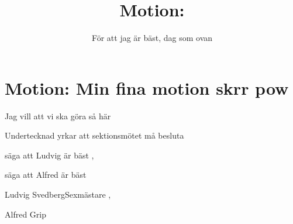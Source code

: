\documentclass[nopdfbookmarks,a4paper, 11pt, twoside]{article}
\title{Motion: \TITLE}
\newcommand{\TITLE}{Min fina motion skrr pow} %
\newcommand{\TEXT}{Jag vill att vi ska göra så här} %
\newcommand{\UNDER}{Undertecknad yrkar att sektionsmötet må besluta}
\newcommand{\ATT}[1]{\item #1}
\begin{document}
\section*{Motion: \TITLE}


\TEXT

\UNDER


\begin{attlista}
	\ATT{säga att Ludvig är bäst}
,\ATT{säga att Alfred är bäst}

\end{attlista}


  \signature{För att jag är bäst, dag som ovan}{Ludvig Svedberg}{Sexmästare}
,
  \signature{}{Alfred Grip}
\end{document}

